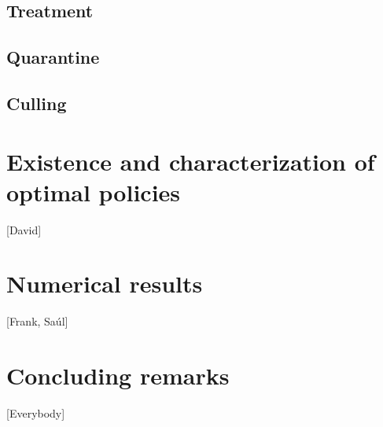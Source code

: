 \documentclass[a4paper]{amsart}
\begin{document}
	    \subsection{Treatment}
	    	
	    	
	    \subsection{Quarantine}
	    	
	    \subsection{Culling}
	    	
	\section{Existence and characterization of optimal policies}
		[David]
	\section{Numerical results}
		
		[Frank, Saúl]
	\section{Concluding remarks}
		[Everybody]
%
	
	
\end{document}
